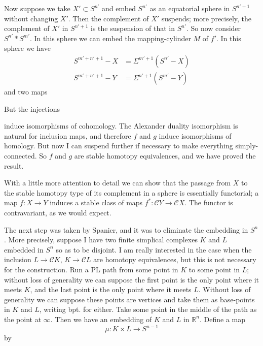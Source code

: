 \documentclass[../main]{subfiles}
\begin{document}
Now suppose we take $X'\subset S^{n'}$ and embed $S^{n'}$ as an equatorial sphere in $S^{n'+1}$ without changing $X'$. Then the complement of $X'$ suspends; more precisely, the complement of $X'$ in $S^{n'+1}$ is the suspension of that in $S^{n'}$. So now consider $S^{n'}\!\ast S^{m'}$. In this sphere we can embed the mapping-cylinder $M$ of $f'$. In this sphere we have 
\begin{align*}
    S^{m'+n'+1}-X&=\Sigma^{m'+1}(S^{n'}-X)\\
    S^{m'+n'+1}-Y&=\Sigma^{n'+1}(S^{m'}-Y)
\end{align*}
and two maps
\begin{center}
\end{center}
But the injections 
\begin{center}
\end{center}
induce isomorphisms of cohomology. The Alexander duality isomorphism is natural for inclusion maps, and therefore $f$ and $g$ induce isomorphisms of homology. But now I can suspend further if necessary to make everything simply-connected. So $f$ and $g$ are stable homotopy equivalences, and we have proved the result.

With a little more attention to detail we can show that the passage from $X$ to the stable homotopy type of its complement in a sphere is essentially functorial; a map $f\colon X\longrightarrow Y$ induces a stable class of maps $f^{\ast}\colon\mathcal{C}Y\longrightarrow\mathcal{C}X$. The functor is contravariant, as we would expect.

The next step was taken by Spanier, and it was to eliminate the embedding in $S^n$. More precisely, suppose I have two finite simplical complexes $K$ and $L$ embedded in $S^n$ so as to be disjoint. I am really interested in the case when the inclusion $L\longrightarrow\mathcal{C}K$, $K\to\mathcal{C}L$ are homotopy equivalences, but this is not necessary for the construction. Run a PL path from some point in $K$ to some point in $L$; without loss of generality we can suppose the first point is the only point where it meets $K$, and the last point is the only point where it meets $L$. Without loss of generality we can suppose these points are vertices and take them as base-points in $K$ and $L$, writing bpt. for either. Take some point in the middle of the path as the point at $\infty$. Then we have an embedding of $K$ and $L$ in $\mathbb{R}^n$. Define a map \[\mu\colon K\times L\longrightarrow S^{n-1}\]by
\end{document}
